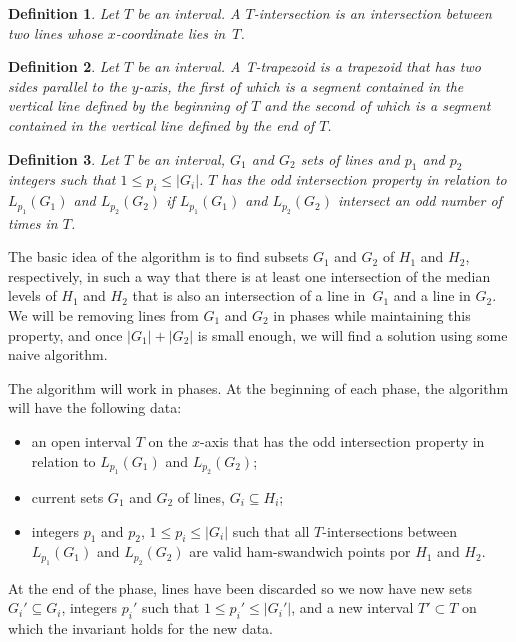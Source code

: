 \documentclass{article}
\newtheorem{definition}{Definition}
\begin{document}
\begin{definition}
Let $T$ be an interval. A \textit{$T$-intersection} is an intersection between two lines whose $x$-coordinate lies in~$T$.
\end{definition}

\begin{definition}
Let $T$ be an interval. A \textit{T-trapezoid} is a trapezoid that has two sides parallel to the $y$-axis, the first of which is a segment contained in the vertical line defined by the beginning of $T$ and the second of which is a segment contained in the vertical line defined by the end of $T$.
\end{definition}

\begin{definition}
Let $T$ be an interval, $G_1$ and $G_2$ sets of lines and $p_1$ and $p_2$ integers such that $1 \leq p_i \leq |G_i|$. $T$ has the odd intersection property in relation to $L_{p_1}(G_1)$ and $L_{p_2}(G_2)$ if $L_{p_1}(G_1)$ and $L_{p_2}(G_2)$ intersect an odd number of times in $T$.
\end{definition}

The basic idea of the algorithm is to find subsets $G_1$ and $G_2$ of $H_1$ and $H_2$, respectively, in such a way that there is at least one intersection of the median levels of $H_1$ and $H_2$ that is also an intersection of a line in~$G_1$ and a line in $G_2$. We will be removing lines from $G_1$ and $G_2$ in phases while maintaining this property, and once $|G_1|+|G_2|$ is small enough, we will find a solution using some naive algorithm.

The algorithm will work in phases. At the beginning of each phase, the algorithm will have the following data:

\begin{itemize}
    \item an open interval $T$ on the $x$-axis that has the odd intersection property in relation to $L_{p_1}(G_1)$ and $L_{p_2}(G_2)$;
    \item current sets $G_1$ and $G_2$ of lines, $G_i \subseteq H_i$;
    \item  integers $p_1$ and $p_2$, $1 \leq p_i \leq |G_i|$ such that all $T$-intersections between $L_{p_1}(G_1)$ and $L_{p_2}(G_2)$ are valid ham-swandwich points por $H_1$ and $H_2$.
\end{itemize}

At the end of the phase, lines have been discarded so we now have new sets $G_i' \subseteq G_i$, integers $p_i'$ such that $1 \leq p_i' \leq |G_i'|$, and a new interval $T'\subset T$ on which the invariant holds for the new data.
\end{document}
